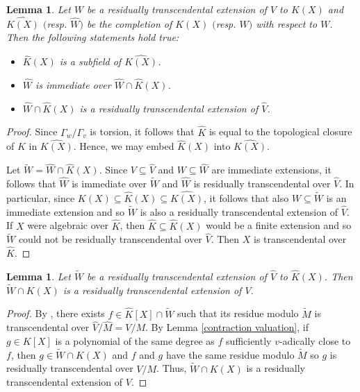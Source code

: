\documentclass[10pt]{article}
\numberwithin{equation}{section}
\newtheorem{Lem}[equation]{Lemma}
\theoremstyle{definition}
\theoremstyle{definition}
\newcommand{\K}{\widehat{K}}
\newcommand{\V}{\widehat{V}}
\newcommand{\W}{\widehat{W}}
\newcommand{\M}{\widehat{M}}
\newcommand{\wW}{\widetilde{W}}
\begin{document}
\begin{Lem}\label{extension rt ext}
Let $W$ be a residually transcendental extension of $V$ to $K(X)$
and $\widehat{K(X)}$ $($resp. $\W)$ be the completion of $K(X)$ $($resp. $W)$ with respect to $W$.
Then the following statements hold true:
\begin{itemize}
\item[{\em (1)}] $\K(X)$ is a subfield of $\widehat{K(X)}$.
\item[{\em (2)}] $\W$ is immediate over $\W\cap\K(X)$.
\item[{\em (3)}] $\W\cap\K(X)$ is a residually transcendental extension of $\V$.
\end{itemize} 
\end{Lem}
\begin{proof}
Since $\Gamma_w/\Gamma_v$ is torsion, it follows that $\K$ is equal to the topological closure of $K$ in $\widehat{K(X)}$. 
Hence, we may embed $\K(X)$ into $\widehat{K(X)}$. 

Let $\widetilde W=\W\cap \K(X)$.
Since $V\subseteq\V$ and $W\subseteq\widehat{W}$ are immediate extensions, it follows that $\widehat{W}$ is immediate over $\widetilde W$ and $\W$ is residually transcendental over $\V$. 
In particular, since $K(X)\subseteq\K(X)\subseteq\widehat{K(X)}$, it follows that also $W\subseteq\widetilde{W}$ is 
an immediate extension and so $\widetilde W$ is also a residually transcendental extension of $\V$. If $X$ were algebraic over $\K$, 
then  $\K\subseteq\K(X)$ would be a finite extension and so $\widetilde W$ could not be residually transcendental over $\V$. 
Then $X$ is transcendental over $\K$. 
\end{proof}



\begin{Lem}\label{contraction rt ext}
Let $\wW$ be a residually transcendental extension of $\V$ to $\K(X)$. Then $\wW\cap K(X)$ is a residually transcendental extension of $V$.
\end{Lem}
\begin{proof}
By \cite[Proposition 1]{AlePop}, there exists $f\in\K[X]\cap \wW$ such that its residue modulo $\widetilde M$ is transcendental over $\V/\M=V/M$. By Lemma \ref{contraction valuation}, 
if $g\in K[X]$ is a polynomial of the same degree as $f$ sufficiently $v$-adically close to $f$,  
then $g\in \wW\cap K(X)$ and $f$ and $g$ have the same residue modulo $\widetilde M$ so $g$ is residually transcendental over $V/M$. 
Thus, $\wW\cap K(X)$ is a residually transcendental extension of $V$.
\end{proof}
\end{document}
